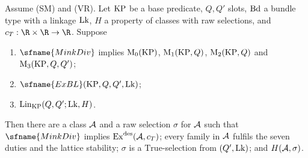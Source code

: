 \begin{theorem}\label{pf:stageU:classsel}
Assume (SM) and (VR). Let $\mathrm{KP}$ be a base predicate, $Q,Q'$ slots, $\mathrm{Bd}$ a bundle type with a linkage
$\mathrm{Lk}$, $H$ a property of classes with raw selections, and $c_T:\R\times\R\to\R$. Suppose
\begin{enumerate}[label=(\roman*)]
\item $\sfname{MinkDiv}$ implies $\mathrm{M}_0(\mathrm{KP})$, $\mathrm{M}_1(\mathrm{KP},Q)$, $\mathrm{M}_2(\mathrm{KP},Q)$ and
$\mathrm{M}_3(\mathrm{KP},Q,Q')$;
\item $\sfname{ExBL}(\stageUKP,Q,Q',\stageULk)$;
\item $\mathrm{Lin}_{\mathrm{KP}}(Q,Q';\mathrm{Lk},H)$.
\end{enumerate}
Then there are a class $\mathcal{A}$ and a raw selection $\sigma$ for $\mathcal{A}$ such that $\sfname{MinkDiv}$ implies
$\mathrm{Ex}^{\mathrm{des}}(\mathcal{A},c_T)$; every family in $\mathcal{A}$ fulfils the seven duties and the lattice stability;
$\sigma$ is a $\mathrm{True}$-selection from $(Q',\mathrm{Lk})$; and $H(\mathcal{A},\sigma)$.
\end{theorem}

